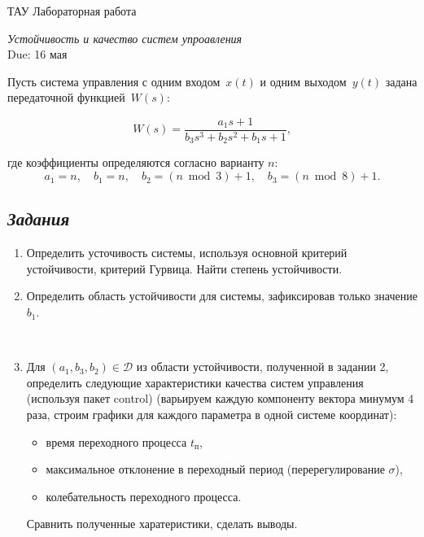 \documentclass[a4paper,oneside,10pt]{book}
\theoremstyle{definition}
\begin{document}
\begin{center}
	{\large  ТАУ \hspace{0.1cm} Лабораторная работа }

	\vspace{5pt}
	\textit{\large Устойчивость и качество систем упроавления}\\ %
	\vspace{10pt}
	Due: 16 мая %
\end{center}

\vspace{0.2 cm}



Пусть система управления с одним входом~$ x(t) $ и одним выходом~$ y(t) $ задана  передаточной функцией~$ W(s) $:

\begin{equation*}
	W(s) =
	\dfrac{a_1 s+1}
	{b_3 s^3 + b_2 s^2 + b_1 s +1} ,
\end{equation*}

где коэффициенты  определяются согласно варианту $ n $:
\begin{equation*}
	a_1 = n, \quad b_1 = n, \quad b_2 = (n\bmod 3) + 1, \quad b_3 = (n \bmod 8) + 1.
\end{equation*}

\subsection*{\textit{Задания}}

\begin{enumerate}
	\item
	      Определить усточивость системы, используя основной критерий устойчивости, критерий Гурвица. Найти степень устойчивости.
	\item
	      Определить область устойчивости для системы, зафиксировав только значение $ b_1 $.

	      \


	\item
	      Для   $(a_1, b_3, b_2)  \in \mathcal{D}$ из области устойчивости, полученной в задании 2, определить следующие характеристики качества систем управления (используя пакет control) (варьируем каждую компоненту вектора минумум 4 раза, строим графики для каждого параметра в одной системе координат):
	      \begin{itemize}
		      \item
		            время переходного процесса $ t_{\text{п}} $,
		      \item
		            максимальное отклонение в переходный период (перерегулирование $ \sigma $),
		      \item
		            колебательность переходного процесса.

	      \end{itemize}

	      Сравнить полученные харатеристики, сделать выводы.
\end{enumerate}
\end{document}
